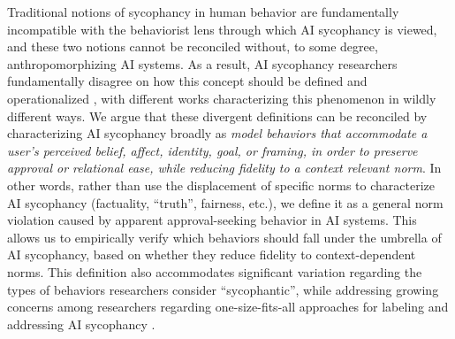 Traditional notions of sycophancy in human behavior are fundamentally incompatible with the behaviorist lens through which AI sycophancy is viewed, and these two notions cannot be reconciled without, to some degree, anthropomorphizing AI systems. As a result, AI sycophancy researchers fundamentally disagree on how this concept should be defined and operationalized \cite{ye2026countsaisycophancytaxonomy}, with different works characterizing this phenomenon in wildly different ways. We argue that these divergent definitions can be reconciled by characterizing AI sycophancy broadly as \textit{model behaviors that accommodate a user's perceived belief, affect, identity, goal, or framing, in order to preserve approval or relational ease, while reducing fidelity to a context relevant norm}. In other words, rather than use the displacement of specific norms to characterize AI sycophancy (factuality, ``truth'', fairness, etc.), we define it as a general norm violation caused by apparent approval-seeking behavior in AI systems. This allows us to empirically verify which behaviors should fall under the umbrella of AI sycophancy, based on whether they reduce fidelity to context-dependent norms. This definition also accommodates significant variation regarding the types of behaviors researchers consider ``sycophantic'', while addressing growing concerns among researchers regarding one-size-fits-all approaches for labeling and addressing AI sycophancy \cite{Vennemeyer2025SycophancyIN, ye2026countsaisycophancytaxonomy}.



